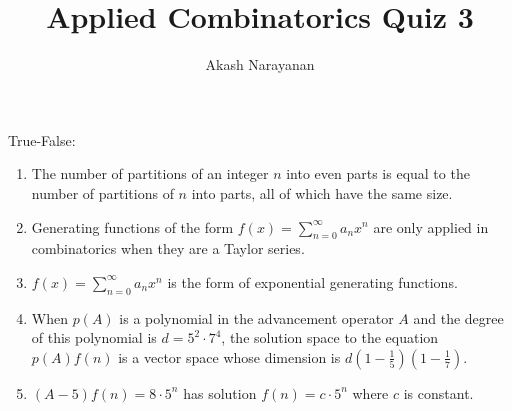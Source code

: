 \documentclass[12pt]{article}
\title{Applied Combinatorics Quiz 3}
\author{Akash Narayanan}
\begin{document}
  \maketitle

  True-False:

  \begin{enumerate}
    \item {} The number of partitions of an integer \(n\) into even parts is equal to the number of partitions of \(n\) into parts, all of which have the same size.

    \item {} Generating functions of the form \(f(x) = \sum_{n=0}^{\infty} a_{n} x^{n}\) are only applied in combinatorics when they are a Taylor series.

    \item {} \(f(x) = \sum_{n=0}^{\infty} a_{n} x^{n}\) is the form of exponential generating functions.

    \item {} When \(p(A)\) is a polynomial in the advancement operator \(A\) and the degree of this polynomial is \(d = 5^{2} \cdot 7^{4}\), the solution space to the equation \(p(A) f(n)\) is a vector space whose dimension is \(d(1 - \frac{1}{5})(1 - \frac{1}{7})\).

    \item {} \((A - 5) f(n) = 8 \cdot 5^{n}\) has solution \(f(n) = c \cdot 5^{n}\) where \(c\) is constant.
  \end{enumerate}
\end{document}
